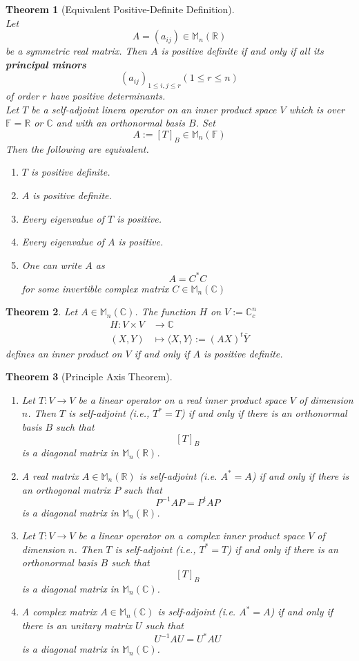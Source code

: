 \documentclass[12pt]{article}
\newtheorem{theorem}{Theorem}[section]
\theoremstyle{definition}
\begin{document}
\begin{theorem}[Equivalent Positive-Definite Definition]
\hfill\\\normalfont Let
\[
A=(a_{ij})\in\mathbb{M}_n(\mathbb{R})
\]
be a symmetric real matrix. Then $A$ is positive definite if and only if all its \textbf{principal minors}
\[
(a_{ij})_{1\leq i,j\leq r}(1\leq r\leq n)
\]
of order $r$ have positive determinants.\\
Let $T$ be a self-adjoint linera operator on an inner product space $V$ which is over $\mathbb{F}=\mathbb{R}$ or $\mathbb{C}$ and with an orthonormal basis $B$. Set
\[
A:=[T]_B\in\mathbb{M}_n(\mathbb{F})
\]
Then the following are equivalent.
\begin{enumerate}[label=(\arabic*)]
\item $T$ is positive definite.
\item $A$ is positive definite.
\item Every eigenvalue of $T$ is positive.
\item Every eigenvalue of $A$ is positive.
\item One can write $A$ as
\[
A=C^\ast C
\]
for some invertible complex matrix $C\in\mathbb{M}_n(\mathbb{C})$
\end{enumerate}
\end{theorem}
\begin{theorem}\normalfont Let $A\in\mathbb{M}_n(\mathbb{C})$. The function $H$ on $V:=\mathbb{C}_c^n$
\[
\begin{aligned}
H:V\times V&\to \mathbb{C}\\
(X,Y)&\mapsto \langle X,Y\rangle :=(AX)^t \overline{Y}
\end{aligned}
\]
defines an inner product on $V$ if and only if $A$ is positive definite.
\end{theorem}
\begin{theorem}[Principle Axis Theorem]
\hfill\\\normalfont
\begin{enumerate}
\item Let $T:V\to V$ be a linear operator on a real inner product space $V$ of dimension $n$. Then $T$ is self-adjoint (i.e., $T^\ast = T$) if and only if there is an orthonormal basis $B$ such that 
\[
[T]_B
\]
is a diagonal matrix in $\mathbb{M}_n(\mathbb{R})$.
\item A real matrix $A\in\mathbb{M}_n(\mathbb{R})$ is self-adjoint (i.e. $A^\ast = A$) if and only if there is an orthogonal matrix $P$ such that
\[
P^{-1}AP=P^t AP
\]
is a diagonal matrix in $\mathbb{M}_n(\mathbb{R})$.
\item Let $T:V\to V$ be a linear operator on a complex inner product space $V$ of dimension $n$. Then $T$ is self-adjoint (i.e., $T^\ast = T$) if and only if there is an orthonormal basis $B$ such that 
\[
[T]_B
\]
is a diagonal matrix in $\mathbb{M}_n(\mathbb{C})$.
\item A complex matrix $A\in\mathbb{M}_n(\mathbb{C})$ is self-adjoint (i.e. $A^\ast = A$) if and only if there is an unitary matrix $U$ such that
\[
U^{-1}AU=U^\ast AU
\]
is a diagonal matrix in $\mathbb{M}_n(\mathbb{C})$.
\end{enumerate}
\end{theorem}
\end{document}
